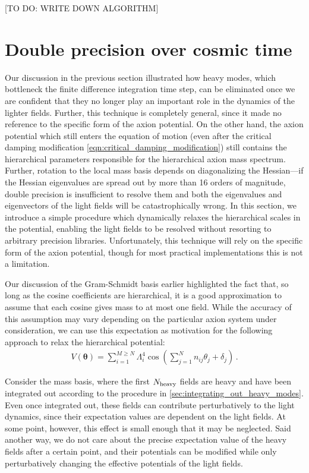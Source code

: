 \documentclass{article}
\begin{document}
[TO DO: WRITE DOWN ALGORITHM]

\section{Double precision over cosmic time}\label{sec:double_precision_over_cosmic_time}
Our discussion in the previous section illustrated how heavy modes, which bottleneck the finite difference integration time step, can be eliminated once we are confident that they no longer play an important role in the dynamics of the lighter fields. Further, this technique is completely general, since it made no reference to the specific form of the axion potential. On the other hand, the axion potential which still enters the equation of motion (even after the critical damping modification \cref{eqn:critical_damping_modification}) still contains the hierarchical parameters responsible for the hierarchical axion mass spectrum. Further, rotation to the local mass basis depends on diagonalizing the Hessian---if the Hessian eigenvalues are spread out by more than 16 orders of magnitude, double precision is insufficient to resolve them and both the eigenvalues and eigenvectors of the light fields will be catastrophically wrong. In this section, we introduce a simple procedure which dynamically relaxes the hierarchical scales in the potential, enabling the light fields to be resolved without resorting to arbitrary precision libraries. Unfortunately, this technique will rely on the specific form of the axion potential, though for most practical implementations this is not a limitation.

Our discussion of the Gram-Schmidt basis earlier highlighted the fact that, so long as the cosine coefficients are hierarchical, it is a good approximation to assume that each cosine gives mass to at most one field. While the accuracy of this assumption may vary depending on the particular axion system under consideration, we can use this expectation as motivation for the following approach to relax the hierarchical potential:
\begin{align}
    V({\bm\theta}) = \sum_{i = 1}^{M\geq N}\Lambda_i^4\cos\left(\sum_{j = 1}^N n_{ij}\theta_j + \delta_j\right)\,.
\end{align}

Consider the mass basis, where the first $N_{\rm heavy}$ fields are heavy and have been integrated out according to the procedure in \cref{sec:integrating_out_heavy_modes}. Even once integrated out, these fields can contribute perturbatively to the light dynamics, since their expectation values are dependent on the light fields. At some point, however, this effect is small enough that it may be neglected. Said another way, we do not care about the precise expectation value of the heavy fields after a certain point, and their potentials can be modified while only perturbatively changing the effective potentials of the light fields.
\end{document}
